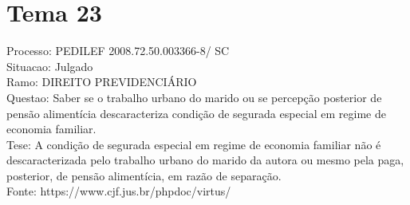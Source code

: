 \documentclass[12pt]{article}
\begin{document}
\section*{Tema 23}
Processo: PEDILEF 2008.72.50.003366-8/ SC\\
Situacao: Julgado\\
Ramo: DIREITO PREVIDENCIÁRIO\\
Questao: Saber se o trabalho urbano do marido ou se percepção posterior de pensão alimentícia descaracteriza condição de segurada especial em regime de economia familiar.\\
Tese: A condição de segurada especial em regime de economia familiar não é descaracterizada pelo trabalho urbano do marido da autora ou mesmo pela paga, posterior, de pensão alimentícia, em razão de separação.\\
Fonte: https://www.cjf.jus.br/phpdoc/virtus/
\end{document}
